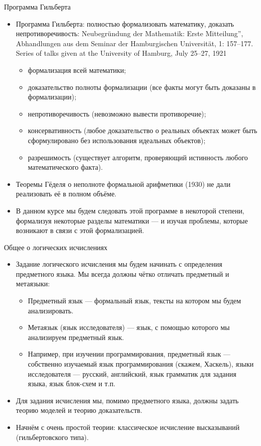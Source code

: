 \documentclass[aspectratio=169]{beamer}
\begin{document}
\begin{frame}{Программа Гильберта}
\begin{itemize}
\item Программа Гильберта: полностью формализовать математику, доказать непротиворечивость:
Neubegründung der Mathematik: Erste Mitteilung”, Abhandlungen aus dem Seminar der Hamburgischen Universität, 1: 157–177. Series of talks given at the University of Hamburg, July 25–27, 1921

\begin{itemize}
\item формализация всей математики;
\item доказательство полноты формализации (все факты могут быть доказаны в формализации);
\item непротиворечивость (невозможно вывести противоречие);
\item консервативность (любое доказательство о реальных объектах может быть сформулировано без использования идеальных объектов);
\item разрешимость (существует алгоритм, проверяющий истинность любого математического факта).
\end{itemize}

\item Теоремы Гёделя о неполноте формальной арифметики (1930) не дали реализовать её в полном объёме.
\item В данном курсе мы будем следовать этой программе в некоторой степени, 
формализуя некоторые разделы математики --- и изучая проблемы, которые возникают в связи с этой формализацией.
\end{itemize}
\end{frame}

\begin{frame}{Общее о логических исчислениях}
\begin{itemize}
\item Задание логического исчисления мы будем начинать с определения предметного языка. 
Мы всегда должны чётко отличать предметный и метаязыки:
\begin{itemize}
\item Предметный язык --- формальный язык, тексты на котором мы будем анализировать.
\item Метаязык (язык исследователя) --- язык, с помощью которого мы анализируем предметный язык.
\item Например, при изучении программирования, предметный язык --- собственно изучаемый язык
программирования (скажем, Хаскель), языки исследователя --- русский, английский, язык грамматик
для задания языка, язык блок-схем и т.п.
\end{itemize}
\item Для задания исчисления мы, помимо предметного языка, должны задать теорию моделей и теорию доказательств.
\item Начнём с очень простой теории: классическое исчисление высказываний (гильбертовского типа).
\end{itemize}
\end{frame}
\end{document}
